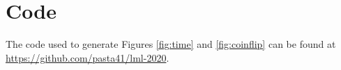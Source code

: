 \documentclass[sigplan,screen]{acmart}
\begin{document}
\section*{Code}
The code used to generate Figures \ref{fig:time} and \ref{fig:coinflip} can be found at \url{https://github.com/pasta41/lml-2020}.



\end{document}
